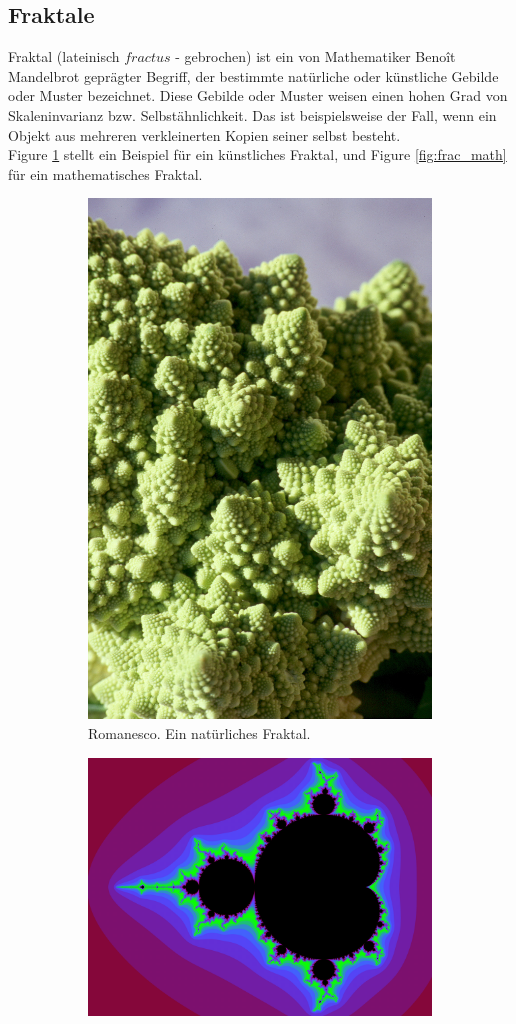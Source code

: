 \documentclass[a4paper,12pt]{llncs}
\numberwithin{equation}{section}
\begin{document}
\subsection{Fraktale}
Fraktal (lateinisch $fractus$ - gebrochen) ist ein von Mathematiker Benoît Mandelbrot geprägter Begriff, der bestimmte natürliche oder künstliche Gebilde oder Muster bezeichnet. Diese Gebilde oder Muster weisen einen hohen Grad von Skaleninvarianz bzw. Selbstähnlichkeit. 
Das ist beispielsweise der Fall, wenn ein Objekt aus mehreren verkleinerten Kopien seiner selbst besteht. \cite{fraktal} \\
Figure \ref{fig:frac_kunst} stellt ein Beispiel für ein künstliches Fraktal, und Figure \ref{fig:frac_math} für ein mathematisches Fraktal.
\begin{figure}[ht]   
	\begin{subfigure}{.5\textwidth}
	\centering
	\includegraphics[width=.6\linewidth]{figures/Romanesco}
	\caption{Romanesco. Ein natürliches Fraktal. \cite{fractal_romanesco}}
	\label{fig:frac_kunst}
\end{subfigure}%
\begin{subfigure}{.5\textwidth}
	\centering
	\includegraphics[width=.9\linewidth, angle =90 ]{figures/Mandelbrot}

\end{subfigure}
\end{figure}
\end{document}
